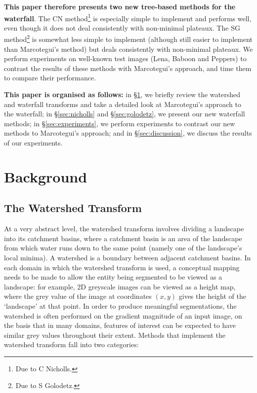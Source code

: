 \documentclass[preprint,a4paper]{elsarticle}
\begin{document}
\pagebreak

\textbf{This paper therefore presents two new tree-based methods for the waterfall}. The CN method\footnote{Due to C Nicholls.} is especially simple to implement and performs well, even though it does not deal consistently with non-minimal plateaux. The SG method\footnote{Due to S Golodetz.} is somewhat less simple to implement (although still easier to implement than Marcotegui's method) but deals consistently with non-minimal plateaux. We perform experiments on well-known test images (Lena, Baboon and Peppers) to contrast the results of these methods with Marcotegui's approach, and time them to compare their performance.

\textbf{This paper is organised as follows:} in \S\ref{sec:background}, we briefly review the watershed and waterfall transforms and take a detailed look at Marcotegui's approach to the waterfall; in \S\ref{sec:nicholls} and \S\ref{sec:golodetz}, we present our new waterfall methods; in \S\ref{sec:experiments}, we perform experiments to contrast our new methods to Marcotegui's approach; and in \S\ref{sec:discussion}, we discuss the results of our experiments.

\section{Background}
\label{sec:background}

\subsection{The Watershed Transform}

At a very abstract level, the watershed transform involves dividing a landscape into its catchment basins, where a catchment basin is an area of the landscape from which water runs down to the same point (namely one of the landscape's local minima). A watershed is a boundary between adjacent catchment basins. In each domain in which the watershed transform is used, a conceptual mapping needs to be made to allow the entity being segmented to be viewed as a landscape: for example, 2D greyscale images can be viewed as a height map, where the grey value of the image at coordinates $(x,y)$ gives the height of the `landscape' at that point. In order to produce meaningful segmentations, the watershed is often performed on the gradient magnitude of an input image, on the basis that in many domains, features of interest can be expected to have similar grey values throughout their extent. Methods that implement the watershed transform fall into two categories:
\end{document}
